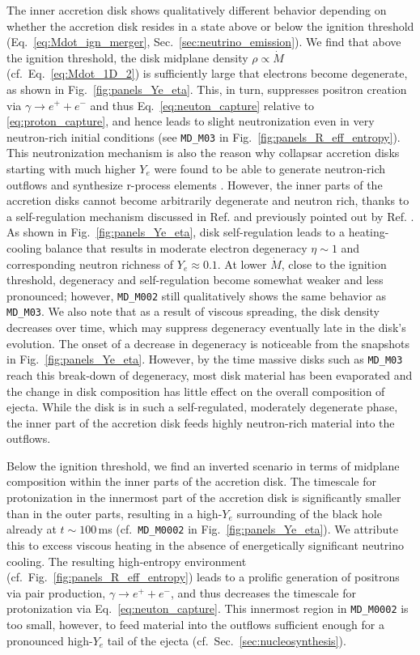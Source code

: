 The inner accretion disk shows qualitatively different behavior depending on whether the accretion disk resides in a state above or below the ignition threshold (Eq.~\eqref{eq:Mdot_ign_merger}, Sec.~\ref{sec:neutrino_emission}). We find that above the ignition threshold, the disk midplane density $\rho\propto \dot{M}$ (cf.~Eq.~\eqref{eq:Mdot_1D_2}) is sufficiently large that electrons become degenerate, as shown in Fig.~\ref{fig:panels_Ye_eta}. This, in turn, suppresses positron creation via $\gamma\rightarrow e^+ + e^-$ and thus Eq.~\eqref{eq:neuton_capture} relative to \eqref{eq:proton_capture}, and hence leads to slight neutronization even in very neutron-rich initial conditions (see \texttt{MD\_M03} in Fig.~\ref{fig:panels_R_eff_entropy}). This neutronization mechanism is also the reason why collapsar accretion disks starting with much higher $Y_e$ were found to be able to generate neutron-rich outflows and synthesize r-process elements \cite{siegel_collapsars_2019}. However, the inner parts of the accretion disks cannot become arbitrarily degenerate and neutron rich, thanks to a self-regulation mechanism discussed in Ref. \cite{Siegel:2017jug} and previously pointed out by Ref. \cite{chen_neutrino-cooled_2007}. As shown in Fig.~\ref{fig:panels_Ye_eta}, disk self-regulation leads to a heating-cooling balance that results in moderate electron degeneracy $\eta\sim 1$ and corresponding neutron richness of $Y_e\approx 0.1$. At lower $\dot{M}$, close to the ignition threshold, degeneracy and self-regulation become somewhat weaker and less pronounced; however, \texttt{MD\_M002} still qualitatively shows the same behavior as \texttt{MD\_M03}. We also note that as a result of viscous spreading, the disk density decreases over time, which may suppress degeneracy eventually late in the disk's evolution. The onset of a decrease in degeneracy is noticeable from the snapshots in Fig.~\ref{fig:panels_Ye_eta}. However, by the time massive disks such as \texttt{MD\_M03} reach this break-down of degeneracy, most disk material has been evaporated and the change in disk composition has little effect on the overall composition of ejecta. While the disk is in such a self-regulated, moderately degenerate phase, the inner part of the accretion disk feeds highly neutron-rich material into the outflows.

Below the ignition threshold, we find an inverted scenario in terms of midplane composition within the inner parts of the accretion disk. The timescale for protonization in the innermost part of the accretion disk is significantly smaller than in the outer parts, resulting in a high-$Y_e$ surrounding of the black hole already at $t\sim100$\,ms (cf.~\texttt{MD\_M0002} in Fig.~\ref{fig:panels_Ye_eta}). We attribute this to excess viscous heating in the absence of energetically significant neutrino cooling. The resulting high-entropy environment (cf.~Fig.~\ref{fig:panels_R_eff_entropy}) leads to a prolific generation of positrons via pair production, $\gamma\rightarrow e^+ + e^-$, and thus decreases the timescale for protonization via Eq.~\eqref{eq:neuton_capture}. This innermost region in \texttt{MD\_M0002} is too small, however, to feed material into the outflows sufficient enough for a pronounced high-$Y_e$ tail of the ejecta (cf.~Sec.~\ref{sec:nucleosynthesis}).


